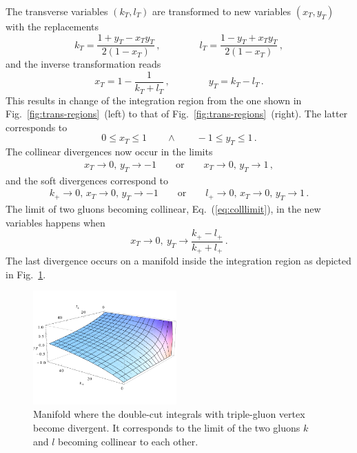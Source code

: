 \documentclass[a4paper,11pt]{article}
\newcommand{\kp}{k_+}
\newcommand{\lp}{l_+}
\numberwithin{equation}{section}
\begin{document}
The transverse variables $(k_T, l_T)$ are transformed to new variables 
$(x_T, y_T)$ with the replacements
%
\begin{equation}
  k_T = \frac{1+y_T-x_T y_T}{2(1-x_T)}\,,
  \qquad \qquad
  l_T = \frac{1-y_T+x_T y_T}{2(1-x_T)}\,,
\end{equation}
%
and the inverse transformation reads
\begin{equation}
  x_T = 1-\frac{1}{k_T+l_T}\,,
  \qquad \qquad
  y_T = k_T-l_T\,.
\end{equation}
%
This results in change of the integration region from the one shown in
Fig.~\ref{fig:trans-regions}~(left) to that of
Fig.~\ref{fig:trans-regions}~(right). The latter corresponds to
%
\begin{equation}
  0 \leq x_T \leq 1
  \qquad \land \qquad
  -1 \leq y_T \leq 1\,.
\end{equation}
%
The collinear divergences now occur in the limits
\begin{eqnarray}
  x_T \to 0,\, y_T \to -1 \qquad \text{or} \qquad
  x_T \to 0,\, y_T \to 1\,, 
\end{eqnarray}
and the soft divergences correspond to
\begin{eqnarray}
  k_+ \to 0,\,  x_T \to 0,\, y_T \to -1 \qquad \text{or} \qquad
  l_+ \to 0,\,  x_T \to 0,\, y_T \to 1\,. 
\end{eqnarray}
%
The limit of two gluons becoming collinear, Eq.~(\ref{eq:colllimit}), in the new
variables happens when
%
%
\begin{equation}
  x_T \to 0,\ y_T \to \displaystyle \frac{\kp-\lp}{\kp+\lp}\,.
  \label{eq:manifoldsing1}
\end{equation}
%
The last divergence occurs on a manifold inside the integration region as
depicted in Fig.~\ref{fig:yTmanifold}.

\begin{figure}[t]
  \begin{center}
    \includegraphics[width=0.49\textwidth]{plots/yTmanifold.pdf}
  \end{center}
  \caption{
  Manifold where the double-cut integrals with triple-gluon vertex become
  divergent. It corresponds to the limit of the two gluons $k$ and $l$ becoming
  collinear to each other.
  }
  \label{fig:yTmanifold}
\end{figure}
\end{document}
